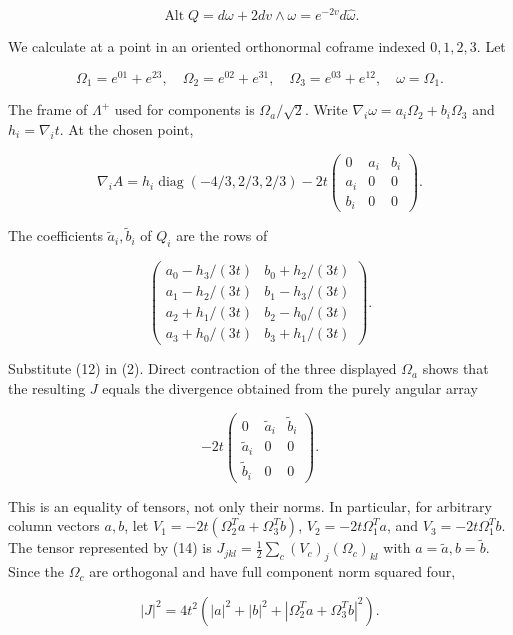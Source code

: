 \documentclass[
]{article}
\begin{document}
\[
 \operatorname{Alt}Q=d\omega+2dv\wedge\omega
                         =e^{-2v}d\widehat\omega.
 \tag{11}
\]

We calculate at a point in an oriented orthonormal coframe indexed
\(0,1,2,3\). Let

\[
 \Omega_1=e^{01}+e^{23},\quad
 \Omega_2=e^{02}+e^{31},\quad
 \Omega_3=e^{03}+e^{12},\quad \omega=\Omega_1.
\]

The frame of \(\Lambda^+\) used for components is \(\Omega_a/\sqrt2\).
Write \(\nabla_i\omega=a_i\Omega_2+b_i\Omega_3\) and \(h_i=\nabla_it\).
At the chosen point,

\[
 \nabla_iA=h_i\operatorname{diag}(-4/3,2/3,2/3)
       -2t\begin{pmatrix}0&a_i&b_i\\a_i&0&0\\b_i&0&0\end{pmatrix}.
 \tag{12}
\]

The coefficients \(\widetilde a_i,\widetilde b_i\) of \(Q_i\) are the
rows of

\[
 \begin{pmatrix}
 a_0-h_3/(3t)&b_0+h_2/(3t)\\
 a_1-h_2/(3t)&b_1-h_3/(3t)\\
 a_2+h_1/(3t)&b_2-h_0/(3t)\\
 a_3+h_0/(3t)&b_3+h_1/(3t)
 \end{pmatrix}.
 \tag{13}
\]

Substitute (12) in (2). Direct contraction of the three displayed
\(\Omega_a\) shows that the resulting \(J\) equals the divergence
obtained from the purely angular array

\[
 -2t\begin{pmatrix}0&\widetilde a_i&\widetilde b_i\\
 \widetilde a_i&0&0\\\widetilde b_i&0&0\end{pmatrix}.
 \tag{14}
\]

This is an equality of tensors, not only their norms. In particular, for
arbitrary column vectors \(a,b\), let
\(V_1=-2t(\Omega_2^Ta+\Omega_3^Tb)\), \(V_2=-2t\Omega_1^Ta\), and
\(V_3=-2t\Omega_1^Tb\). The tensor represented by (14) is
\(J_{jkl}=\frac12\sum_c(V_c)_j(\Omega_c)_{kl}\) with
\(a=\widetilde a,b=\widetilde b\). Since the \(\Omega_c\) are orthogonal
and have full component norm squared four,

\[
 |J|^2=4t^2\left(|a|^2+|b|^2
                   +|\Omega_2^Ta+\Omega_3^Tb|^2\right).
 \tag{15}
\]
\end{document}
